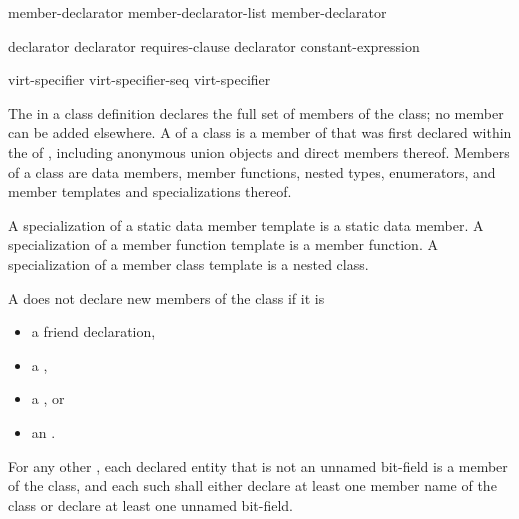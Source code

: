 \begin{bnf}
\br
    member-declarator\br
    member-declarator-list \terminal{,} member-declarator
\end{bnf}

\begin{bnf}
\br
    declarator  \br
    declarator requires-clause\br
    declarator \br
      \terminal{:} constant-expression 
\end{bnf}

\begin{bnf}
\br
    virt-specifier\br
    virt-specifier-seq virt-specifier
\end{bnf}

\begin{bnf}
\br
    \br
\end{bnf}

\begin{bnf}
\br
    \terminal{=} 
\end{bnf}

\pnum
{}%
The  in a class definition declares the
full set of members of the class; no member can be added elsewhere.
A  of a class  is a member of 
that was first declared within the  of ,
including anonymous union objects and direct members thereof.
Members of a class are data members, member
functions, nested types, enumerators,
and member templates and specializations thereof.
\begin{note}
A specialization of a static data member template is a static data member.
A specialization of a member function template is a member function.
A specialization of a member class template is a nested class.
\end{note}

\pnum
A  does not declare new members of the class
if it is
\begin{itemize}
\item a friend declaration,
\item a ,
\item a , or
\item an .
\end{itemize}
For any other ,
each declared entity
that is not an unnamed bit-field
is a member of the class,
and each such 
shall either
declare at least one member name of the class
or declare at least one unnamed bit-field.

